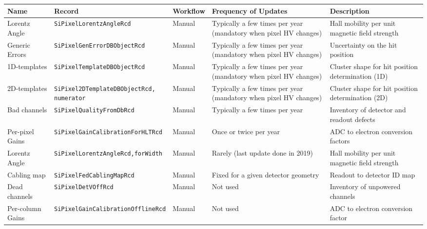 \begin{table}[h!]
    \centering
    \begin{adjustbox}{max width=\textwidth}
    \begin{tabular}{p{2.5cm}|p{5.7cm}|p{1.5cm}|p{2.5cm}|p{3.0cm}}
        \textbf{Name} & \textbf{Record} & \textbf{Workflow} & \textbf{Frequency of Updates} & \textbf{Description} \\ \hline
      Lorentz Angle   & \texttt{SiPixelLorentzAngleRcd}                 & Manual & Typically a few times per year (mandatory when pixel HV changes) & Hall mobility per unit magnetic field strength\\ \hline
      Generic Errors  & \texttt{SiPixelGenErrorDBObjectRcd}             & Manual & Typically a few times per year (mandatory when pixel HV changes) & Uncertainty on the hit position \\ \hline
      1D-templates     & \texttt{SiPixelTemplateDBObjectRcd}             & Manual & Typically a few times per year (mandatory when pixel HV changes) & Cluster shape for hit position determination (1D)\\ \hline
      2D-templates    & \parbox[t]{5cm}{\texttt{SiPixel2DTemplateDBObjectRcd,}\\\texttt{numerator}} & Manual & Typically a few times per year (mandatory when pixel HV changes) & Cluster shape for hit position determination (2D)\\ \hline
      Bad channels    & \texttt{SiPixelQualityFromDbRcd}                & Manual & Typically a few times per year & Inventory of detector and readout defects \\ \hline
      Per-pixel Gains & \texttt{SiPixelGainCalibrationForHLTRcd}        & Manual & Once or twice per year & ADC to electron conversion factors \\ \hline
      Lorentz Angle   & \texttt{SiPixelLorentzAngleRcd,forWidth}        & Manual & Rarely (last update done in 2019) & Hall mobility per unit magnetic field strength \\ \hline
      Cabling map     & \texttt{SiPixelFedCablingMapRcd}                & Manual & Fixed for a given detector geometry & Readout to detector ID map \\ \hline
      Dead channels   & \texttt{SiPixelDetVOffRcd}                      & Manual & Not used & Inventory of unpowered channels \\ \hline
      Per-column Gains& \texttt{SiPixelGainCalibrationOfflineRcd}       & Manual & Not used & ADC to electron conversion factor \\ \hline

\end{tabular}
\end{adjustbox}
\end{table}
